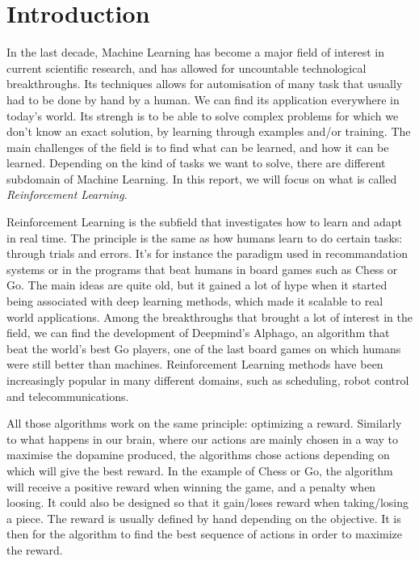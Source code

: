 \section{Introduction}

In the last decade, Machine Learning has become a major field of interest in current scientific research, and has allowed for uncountable technological breakthroughs. Its techniques allows for automisation of many task that usually had to be done by hand by a human. We can find its application everywhere in today’s world. Its strengh is to be able to solve complex problems for which we don’t know an exact solution, by learning through examples and/or training. The main challenges of the field is to find what can be learned, and how it can be learned. Depending on the kind of tasks we want to solve, there are different subdomain of Machine Learning. In this report, we will focus on what is called \emph{Reinforcement Learning}.

Reinforcement Learning is the subfield that investigates how to learn and adapt in real time. The principle is the same as how humans learn to do certain tasks: through trials and errors. It’s for instance the paradigm used in recommandation systems or in the programs that beat humans in board games such as Chess or Go.
The main ideas are quite old\cite{bellman1966dynamic}\cite{bertsekas2012dynamic}, but it gained a lot of hype when it started being associated with deep learning methods, which made it scalable to real world applications. Among the breakthroughs that brought a lot of interest in the field, we can find the development of Deepmind’s Alphago, an algorithm that beat the world’s best Go players, one of the last board games on which humans were still better than machines. Reinforcement Learning methods have been increasingly popular in many different domains, such as scheduling, robot control and telecommunications.

All those algorithms work on the same principle: optimizing a reward. Similarly to what happens in our brain, where our actions are mainly chosen in a way to maximise the dopamine produced, the algorithms chose actions depending on which will give the best reward. In the example of Chess or Go, the algorithm will receive a positive reward when winning the game, and a penalty when loosing. It could also be designed so that it gain/loses reward when taking/losing a piece. The reward is usually defined by hand depending on the objective. It is then for the algorithm to find the best sequence of actions in order to maximize the reward.

